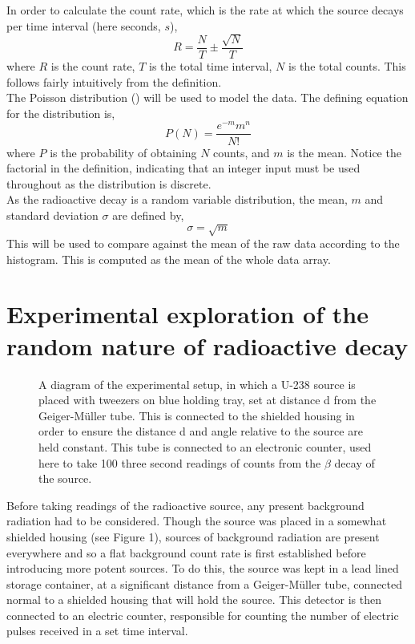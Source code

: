 \documentclass[11pt]{article}
\begin{document}
In order to calculate the count rate, which is the rate at which the source decays per time interval (here seconds, $s$), 
  \begin{equation} 
  R = \frac{N}{T} \pm \frac{\sqrt{N}}{T}
   \end{equation}
where $R$ is the count rate, $T$ is the total time interval, $N$ is the total counts. This follows fairly intuitively from the definition. \\
The Poisson distribution (\cite{hu2008poisson}) will be used to model the data. The defining equation for the distribution is, 
    \begin{equation}
        P(N) = \frac{e^{-m}m^{n}}{N!}
    \end{equation}
where $P$ is the probability of obtaining $N$ counts, and $m$ is the mean. Notice the factorial in the definition, indicating that an integer input must be used throughout as the distribution is discrete. \\
    As the radioactive decay is a random variable distribution, the mean, $m$ and standard deviation $\sigma$ are defined by,
    \begin{equation}
        \sigma = \sqrt{m}
    \end{equation}
This will be used to compare against the mean of the raw data according to the histogram. This is computed as the mean of the whole data array. 
    \section{Experimental exploration of the random nature of radioactive decay}
\begin{figure}[h]
        \begin{center}
            \def\svgwidth{\columnwidth}
            
             \caption{A diagram of the experimental setup, in which a U-238 source is placed with tweezers on blue holding tray, set at distance d from the Geiger-Müller tube. This is connected to the shielded housing in order to ensure the distance d and angle relative to the source are held constant. This tube is connected to an electronic counter, used here to take  100 three second readings of counts from the $\beta$ decay of the source.}
             \label{fig:experimental setup}
        \end{center}
    \end{figure}
\noindent Before taking readings of the radioactive source, any present background radiation had to be considered. Though the source was placed in a somewhat shielded housing (see Figure 1), sources of background radiation are present everywhere and so a flat background count rate is first established before introducing more potent sources. To do this, the source was kept in a lead lined storage container, at a significant distance from a Geiger-Müller tube, connected normal to a shielded housing that will hold the source. This detector is then connected to an electric counter, responsible for counting the number of electric pulses received in a set time interval.
\end{document}
